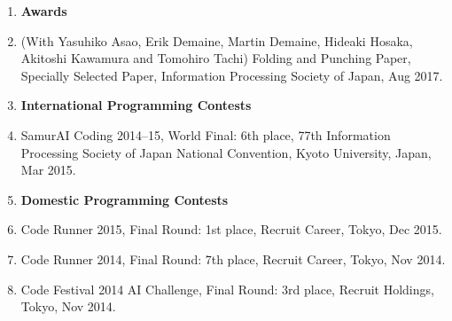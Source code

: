 \begin{enumerate}
  \item[] {\bf Awards}
  \item (With Yasuhiko Asao, Erik Demaine, Martin Demaine, Hideaki Hosaka, Akitoshi Kawamura and Tomohiro Tachi) Folding and Punching Paper, Specially Selected Paper, Information Processing Society of Japan, Aug 2017.
  \item[] {\bf International Programming Contests}
  \item SamurAI Coding 2014--15, World Final: 6th place, 77th Information Processing Society of Japan National Convention, Kyoto University, Japan, Mar 2015.
  \item[] {\bf Domestic Programming Contests}
  \item Code Runner 2015, Final Round: 1st place, Recruit Career, Tokyo, Dec 2015.
  \item Code Runner 2014, Final Round: 7th place, Recruit Career, Tokyo, Nov 2014.
  \item Code Festival 2014 AI Challenge, Final Round: 3rd place, Recruit Holdings, Tokyo, Nov 2014.
\end{enumerate}
